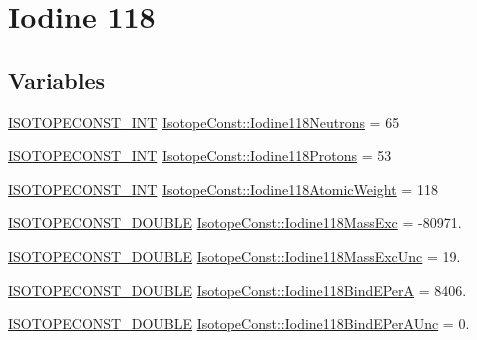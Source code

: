 \hypertarget{group___isotope_const-_iodine-_i118}{}\section{Iodine 118}
\label{group___isotope_const-_iodine-_i118}
\subsection*{Variables}
\begin{DoxyCompactItemize}
\item 
\mbox{\hyperlink{group___isotope_const-_macros_ga5f18360b3e99483a35c32d789e62621c}{I\+S\+O\+T\+O\+P\+E\+C\+O\+N\+S\+T\+\_\+\+I\+NT}} \mbox{\hyperlink{group___isotope_const-_iodine-_i118_ga8cfff639f08ac3be85941b30900d17d8}{Isotope\+Const\+::\+Iodine118\+Neutrons}} = 65
\item 
\mbox{\hyperlink{group___isotope_const-_macros_ga5f18360b3e99483a35c32d789e62621c}{I\+S\+O\+T\+O\+P\+E\+C\+O\+N\+S\+T\+\_\+\+I\+NT}} \mbox{\hyperlink{group___isotope_const-_iodine-_i118_ga0624243029313224b52cdaf226d35f9c}{Isotope\+Const\+::\+Iodine118\+Protons}} = 53
\item 
\mbox{\hyperlink{group___isotope_const-_macros_ga5f18360b3e99483a35c32d789e62621c}{I\+S\+O\+T\+O\+P\+E\+C\+O\+N\+S\+T\+\_\+\+I\+NT}} \mbox{\hyperlink{group___isotope_const-_iodine-_i118_ga8dc7162d1e5d9da61b0bf877bc1e01b7}{Isotope\+Const\+::\+Iodine118\+Atomic\+Weight}} = 118
\item 
\mbox{\hyperlink{group___isotope_const-_macros_ga8f45a7272ce02c0b4c65c44636ed719a}{I\+S\+O\+T\+O\+P\+E\+C\+O\+N\+S\+T\+\_\+\+D\+O\+U\+B\+LE}} \mbox{\hyperlink{group___isotope_const-_iodine-_i118_ga023ae1577b87346dda90b5308dea5f6c}{Isotope\+Const\+::\+Iodine118\+Mass\+Exc}} = -\/80971.
\item 
\mbox{\hyperlink{group___isotope_const-_macros_ga8f45a7272ce02c0b4c65c44636ed719a}{I\+S\+O\+T\+O\+P\+E\+C\+O\+N\+S\+T\+\_\+\+D\+O\+U\+B\+LE}} \mbox{\hyperlink{group___isotope_const-_iodine-_i118_gac6ba8f3df9e45209f35c626925a0a0b2}{Isotope\+Const\+::\+Iodine118\+Mass\+Exc\+Unc}} = 19.
\item 
\mbox{\hyperlink{group___isotope_const-_macros_ga8f45a7272ce02c0b4c65c44636ed719a}{I\+S\+O\+T\+O\+P\+E\+C\+O\+N\+S\+T\+\_\+\+D\+O\+U\+B\+LE}} \mbox{\hyperlink{group___isotope_const-_iodine-_i118_gae069c5e9604b4fc2eb6e180255d75189}{Isotope\+Const\+::\+Iodine118\+Bind\+E\+PerA}} = 8406.
\item 
\mbox{\hyperlink{group___isotope_const-_macros_ga8f45a7272ce02c0b4c65c44636ed719a}{I\+S\+O\+T\+O\+P\+E\+C\+O\+N\+S\+T\+\_\+\+D\+O\+U\+B\+LE}} \mbox{\hyperlink{group___isotope_const-_iodine-_i118_gadd5883d24c2d8d6d65e1b5c473adaf80}{Isotope\+Const\+::\+Iodine118\+Bind\+E\+Per\+A\+Unc}} = 0.

\end{DoxyCompactItemize}
